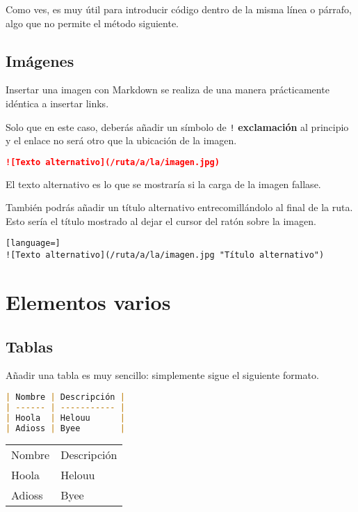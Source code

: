 Como ves, es muy útil para introducir código dentro de la misma línea o párrafo, algo que no permite el método siguiente.

\section{Imágenes}

Insertar una imagen con Markdown se realiza de una manera prácticamente idéntica a insertar links.

Solo que en este caso, deberás añadir un símbolo de \lstinline{!} \textbf{exclamación} al principio y el enlace no será otro que la ubicación de la imagen.

\begin{lstlisting}[language=md]
![Texto alternativo](/ruta/a/la/imagen.jpg)
\end{lstlisting}

El texto alternativo es lo que se mostraría si la carga de la imagen fallase.

También podrás añadir un título alternativo entrecomillándolo al final de la ruta. Esto sería el título mostrado al dejar el cursor del ratón sobre la imagen.

\begin{lstlisting}[language=]
![Texto alternativo](/ruta/a/la/imagen.jpg "Título alternativo")
\end{lstlisting}

\chapter{Elementos varios}

\section{Tablas}

Añadir una tabla es muy sencillo: simplemente sigue el siguiente formato.

\begin{lstlisting}[language= md]
| Nombre | Descripción |
| ------ | ----------- |
| Hoola  | Helouu      |
| Adioss | Byee        |
\end{lstlisting}

\begin{table}[]
\begin{tabular}{ll}
 Nombre & Descripción \\                         
 Hoola  & Helouu      \\
 Adioss & Byee        \\
\end{tabular}
\end{table}

